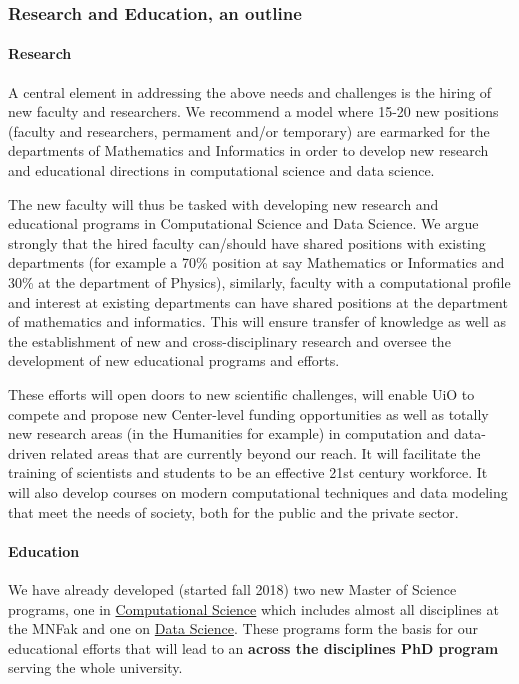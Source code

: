 \documentclass[]{article}
\let\oldparagraph\paragraph
\renewcommand{\paragraph}[1]{\oldparagraph{#1}\mbox{}}
\begin{document}
\hypertarget{research-and-education-an-outline}{%
\subsubsection{Research and Education, an
outline}\label{research-and-education-an-outline}}

\hypertarget{research}{%
\paragraph{Research}\label{research}}

A central element in addressing the above needs and challenges is the
hiring of new faculty and researchers. We recommend a model where 15-20
new positions (faculty and researchers, permament and/or temporary) are
earmarked for the departments of Mathematics and Informatics in order to
develop new research and educational directions in computational science
and data science.

The new faculty will thus be tasked with developing new research and
educational programs in Computational Science and Data Science. We argue
strongly that the hired faculty can/should have shared positions with
existing departments (for example a 70\% position at say Mathematics or
Informatics and 30\% at the department of Physics), similarly, faculty
with a computational profile and interest at existing departments can
have shared positions at the department of mathematics and informatics.
This will ensure transfer of knowledge as well as the establishment of
new and cross-disciplinary research and oversee the development of new
educational programs and efforts.

These efforts will open doors to new scientific challenges, will enable
UiO to compete and propose new Center-level funding opportunities as
well as totally new research areas (in the Humanities for example) in
computation and data-driven related areas that are currently beyond our
reach. It will facilitate the training of scientists and students to be
an effective 21st century workforce. It will also develop courses on
modern computational techniques and data modeling that meet the needs of
society, both for the public and the private sector.

\hypertarget{education}{%
\paragraph{Education}\label{education}}

We have already developed (started fall 2018) two new Master of Science
programs, one in
\href{http://www.uio.no/english/studies/programmes/computational-science-master/index.html}{Computational
Science} which includes almost all disciplines at the MNFak and one on
\href{http://www.uio.no/english/studies/programmes/datascience-master/index.html}{Data
Science}. These programs form the basis for our educational efforts that
will lead to an \textbf{across the disciplines PhD program} serving the
whole university.
\end{document}
